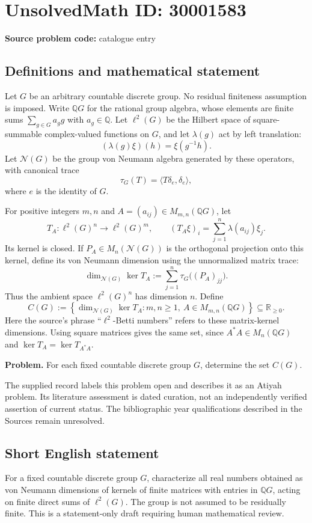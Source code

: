 \documentclass[11pt]{article}
\newcommand{\Q}{\mathbb{Q}}
\newcommand{\R}{\mathbb{R}}
\begin{document}
\section*{UnsolvedMath ID: 30001583}
\textbf{Source problem code:} catalogue entry
\subsection{Definitions and mathematical statement}
Let \(G\) be an arbitrary countable discrete group. No residual finiteness assumption is imposed. Write \(\Q G\) for the rational group algebra, whose elements are finite sums \(\sum_{g\in G}a_g g\) with \(a_g\in\Q\). Let \(\ell^2(G)\) be the Hilbert space of square-summable complex-valued functions on \(G\), and let \(\lambda(g)\) act by left translation:
\[
(\lambda(g)\xi)(h)=\xi(g^{-1}h).
\]
Let \(\mathcal N(G)\) be the group von Neumann algebra generated by these operators, with canonical trace
\[
\tau_G(T)=\langle T\delta_e,\delta_e\rangle,
\]
where \(e\) is the identity of \(G\).

For positive integers \(m,n\) and \(A=(a_{ij})\in M_{m,n}(\Q G)\), let
\[
T_A:\ell^2(G)^n\longrightarrow\ell^2(G)^m,
\qquad
(T_A\xi)_i=\sum_{j=1}^n\lambda(a_{ij})\xi_j.
\]
Its kernel is closed. If \(P_A\in M_n(\mathcal N(G))\) is the orthogonal projection onto this kernel, define its von Neumann dimension using the unnormalized matrix trace:
\[
\dim_{\mathcal N(G)}\ker T_A
:=\sum_{j=1}^n\tau_G\bigl((P_A)_{jj}\bigr).
\]
Thus the ambient space \(\ell^2(G)^n\) has dimension \(n\). Define
\[
C(G):=\left\{
\dim_{\mathcal N(G)}\ker T_A:
 m,n\geq 1,\ A\in M_{m,n}(\Q G)
\right\}\subseteq\R_{\geq0}.
\]
Here the source's phrase ``\(\ell^2\)-Betti numbers'' refers to these matrix-kernel dimensions. Using square matrices gives the same set, since \(A^*A\in M_n(\Q G)\) and \(\ker T_A=\ker T_{A^*A}\).

\textbf{Problem.} For each fixed countable discrete group \(G\), determine the set \(C(G)\).

The supplied record labels this problem open and describes it as an Atiyah problem. Its literature assessment is dated curation, not an independently verified assertion of current status. The bibliographic year qualifications described in the Sources remain unresolved.
\subsection{Short English statement}
For a fixed countable discrete group \(G\), characterize all real numbers obtained as von Neumann dimensions of kernels of finite matrices with entries in \(\Q G\), acting on finite direct sums of \(\ell^2(G)\). The group is not assumed to be residually finite. This is a statement-only draft requiring human mathematical review.
\end{document}
